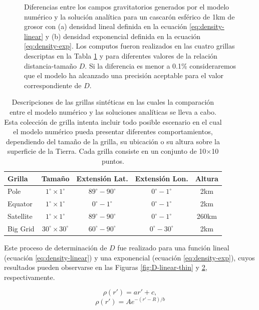 \documentclass[a4paper,10pt]{article}
\begin{document}
\begin{figure}[b!]
\begin{subfigure}[t]{0.5\textwidth}
    \caption{}
    \label{fig:D-exp-thin}
    \end{subfigure}
    \caption{
        Diferencias entre los campos gravitatorios generados por el modelo numérico y la solución analítica para un cascarón esférico de 1km de grosor con (a) densidad lineal definida en la ecuación \ref{eq:density-linear} y (b) densidad exponencial definida en la ecuación \ref{eq:density-exp}. Los computos fueron realizados en las cuatro grillas descriptas en la Tabla \ref{tab:grids} y para diferentes valores de la relación distancia-tamaño $D$. Si la diferencia es menor a 0.1\% consideraremos que el modelo ha alcanzado una precisión aceptable para el valor correspondiente de $D$.
    }
\end{figure}


\begin{table}
\centering
\caption{
    Descripciones de las grillas sintéticas en las cuales la comparación entre el modelo numérico y las soluciones analíticas se lleva a cabo. Esta colección de grilla intenta incluir todo posible escenario en el cual el modelo numérico pueda presentar diferentes comportamientos, dependiendo del tamaño de la grilla, su ubicación o su altura sobre la superficie de la Tierra. Cada grilla consiste en un conjunto de 10$\times$10 puntos.
}
\label{tab:grids}
\begin{tabular}{lcccc}
    Grilla & Tamaño & Extensión Lat. & Extensión Lon. & Altura \\ \hline
    Pole & $1^\circ \times 1^\circ$ & $89^\circ - 90^\circ$ & $0^\circ - 1^\circ$ & 2km \\
    Equator & $1^\circ \times 1^\circ$ & $0^\circ - 1^\circ$ & $0^\circ - 1^\circ$ & 2km \\
    Satellite & $1^\circ \times 1^\circ$ & $89^\circ - 90^\circ$ & $0^\circ - 1^\circ$ & 260km \\
    Big Grid & $30^\circ \times 30^\circ$ & $60^\circ - 90^\circ$ & $0^\circ - 30^\circ$ & 2km \\
\end{tabular}
\end{table}

Este proceso de determinación de $D$ fue realizado para una función lineal (ecuación \ref{eq:density-linear}) y una exponencial (ecuación \ref{eq:density-exp}), cuyos resultados pueden observarse en las Figuras \ref{fig:D-linear-thin} y \ref{fig:D-exp-thin}, respectivamente.

\vspace{-2.5em}
\begin{multicols}{2}
    \centering
    \begin{equation}
        \rho(r') = ar' + c,
        \label{eq:density-linear}
    \end{equation}
    \break
    \centering
    \begin{equation}
        \rho(r') = A e^{-(r' - R)/b}
    \label{eq:density-exp}
    \end{equation}
\end{multicols}
\end{document}

